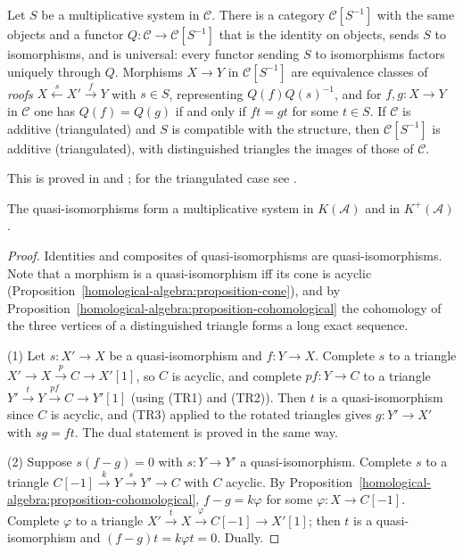 \begin{theorem}[Localisation]\label{homological-algebra:theorem-localisation}
Let $S$ be a multiplicative system in $\mathcal{C}$. There is a category $\mathcal{C}[S^{-1}]$ with the same objects and a functor
$Q \colon \mathcal{C} \to \mathcal{C}[S^{-1}]$ that is the identity on objects, sends $S$ to isomorphisms, and is universal: every functor sending
$S$ to isomorphisms factors uniquely through $Q$. Morphisms $X \to Y$ in $\mathcal{C}[S^{-1}]$ are equivalence classes of \emph{roofs}
$X \xleftarrow{s} X' \xrightarrow{f} Y$ with $s \in S$, representing $Q(f)Q(s)^{-1}$, and for $f, g \colon X \to Y$ in $\mathcal{C}$ one has
$Q(f) = Q(g)$ if and only if $ft = gt$ for some $t \in S$. If $\mathcal{C}$ is additive (triangulated) and $S$ is compatible
with the structure, then $\mathcal{C}[S^{-1}]$ is additive (triangulated), with distinguished triangles the images of those of $\mathcal{C}$.
\end{theorem}

This is proved in \cite[Chapter III]{gelfand-manin} and \cite[Chapter 7]{kashiwara-schapira}; for the triangulated case see
\cite[Section 10.3]{weibel-homological}.

\begin{proposition}\label{homological-algebra:proposition-qis-multiplicative}
The quasi-isomorphisms form a multiplicative system in $K(\mathcal{A})$ and in $K^+(\mathcal{A})$.
\end{proposition}

\begin{proof}
Identities and composites of quasi-isomorphisms are quasi-isomorphisms. Note that a morphism is a quasi-isomorphism iff its cone
is acyclic (Proposition~\ref{homological-algebra:proposition-cone}), and by
Proposition~\ref{homological-algebra:proposition-cohomological} the cohomology of the three vertices of a distinguished triangle
forms a long exact sequence.

(1) Let $s \colon X' \to X$ be a quasi-isomorphism and $f \colon Y \to X$. Complete $s$ to a triangle $X' \to X \xrightarrow{p} C \to X'[1]$, so $C$ is
acyclic, and complete $pf \colon Y \to C$ to a triangle $Y' \xrightarrow{t} Y \xrightarrow{pf} C \to Y'[1]$ (using (TR1) and (TR2)). Then $t$ is a
quasi-isomorphism since $C$ is acyclic, and (TR3) applied to the rotated triangles gives $g \colon Y' \to X'$ with $sg = ft$. The dual
statement is proved in the same way.

(2) Suppose $s(f - g) = 0$ with $s \colon Y \to Y'$ a quasi-isomorphism. Complete $s$ to a triangle $C[-1] \xrightarrow{k} Y \xrightarrow{s} Y' \to C$ with $C$
acyclic. By Proposition~\ref{homological-algebra:proposition-cohomological}, $f - g = k\varphi$ for some $\varphi \colon X \to C[-1]$. Complete $\varphi$ to a
triangle $X' \xrightarrow{t} X \xrightarrow{\varphi} C[-1] \to X'[1]$; then $t$ is a quasi-isomorphism and $(f - g)t = k\varphi t = 0$. Dually.
\end{proof}

